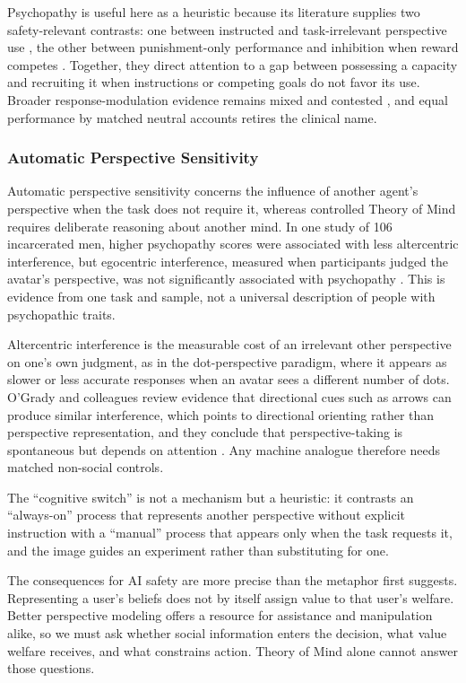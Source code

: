 \documentclass{article}
\begin{document}
Psychopathy is useful here as a heuristic because its literature supplies two safety-relevant contrasts: one between instructed and task-irrelevant perspective use \citep{ref53}, the other between punishment-only performance and inhibition when reward competes \citep{ref54}. Together, they direct attention to a gap between possessing a capacity and recruiting it when instructions or competing goals do not favor its use. Broader response-modulation evidence remains mixed and contested \citep{ref55}, and equal performance by matched neutral accounts retires the clinical name.
\subsubsection{Automatic Perspective Sensitivity}
Automatic perspective sensitivity concerns the influence of another agent's perspective when the task does not require it, whereas controlled Theory of Mind requires deliberate reasoning about another mind. In one study of 106 incarcerated men, higher psychopathy scores were associated with less altercentric interference, but egocentric interference, measured when participants judged the avatar's perspective, was not significantly associated with psychopathy \citep{ref53}. This is evidence from one task and sample, not a universal description of people with psychopathic traits.

Altercentric interference is the measurable cost of an irrelevant other perspective on one's own judgment, as in the dot-perspective paradigm, where it appears as slower or less accurate responses when an avatar sees a different number of dots. O'Grady and colleagues review evidence that directional cues such as arrows can produce similar interference, which points to directional orienting rather than perspective representation, and they conclude that perspective-taking is spontaneous but depends on attention \citep{ref66}. Any machine analogue therefore needs matched non-social controls.

The ``cognitive switch'' is not a mechanism but a heuristic: it contrasts an ``always-on'' process that represents another perspective without explicit instruction with a ``manual'' process that appears only when the task requests it, and the image guides an experiment rather than substituting for one.

The consequences for AI safety are more precise than the metaphor first suggests. Representing a user's beliefs does not by itself assign value to that user's welfare. Better perspective modeling offers a resource for assistance and manipulation alike, so we must ask whether social information enters the decision, what value welfare receives, and what constrains action. Theory of Mind alone cannot answer those questions.
\end{document}
